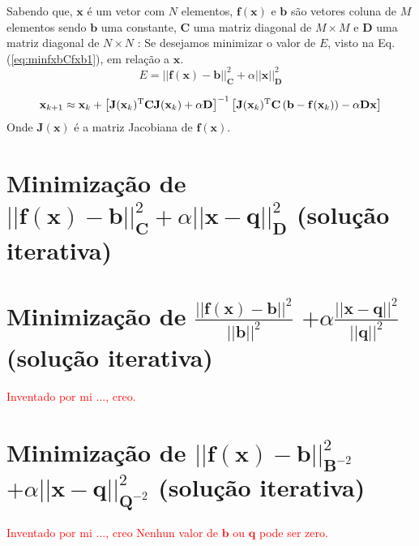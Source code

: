 \begin{theorem}\label{theo:minfxbCfxbaxax}
Sabendo que, $\mathbf{x}$ é um vetor com $N$ elementos, $\mathbf{f}(\mathbf{x})$ e 
$\mathbf{b}$ são vetores coluna de $M$ elementos sendo $\mathbf{b}$ uma constante,
$\mathbf{C}$ uma matriz diagonal de $M \times M$ e 
$\mathbf{D}$ uma matriz diagonal de $N \times N$ :
Se desejamos minimizar o valor de $E$, visto na Eq. (\ref{eq:minfxbCfxb1}), em relação a $\mathbf{x}$.
\begin{equation}\label{eq:minfxbCfxbaxax1}
E=||\mathbf{f}(\mathbf{x})-\mathbf{b}||_{\mathbf{C}}^2+\alpha||\mathbf{x}||_{\mathbf{D}}^2
\end{equation}

\begin{equation}
\mathbf{x}_{k+1}\approx \mathbf{x}_k+
\left[ \mathbf{J}(\mathbf{x}_k)^{\mathrm{T}}\mathbf{C} \mathbf{J}(\mathbf{x}_k) +\alpha\mathbf{D} \right]^{-1}
 \left[\mathbf{J}(\mathbf{x}_k)^{\mathrm{T}}\mathbf{C}\left(\mathbf{b}-\mathbf{f}(\mathbf{x}_k)\right)-\alpha\mathbf{D}\mathbf{x}\right]
\end{equation}
Onde  $\mathbf{J}(\mathbf{x})$ é a matriz Jacobiana de $\mathbf{f}(\mathbf{x})$.
\end{theorem} 



\section{Minimização de $||\mathbf{f}(\mathbf{x})-\mathbf{b}||_{\mathbf{C}}^2+\alpha||\mathbf{x}-\mathbf{q}||_{\mathbf{D}}^2$  
(solução iterativa)
}


\section{Minimização de $\frac{||\mathbf{f}(\mathbf{x})-\mathbf{b}||^2}{||\mathbf{b}||^2}$
$+\alpha\frac{||\mathbf{x}-\mathbf{q}||^2}{||\mathbf{q}||^2}$  
(solução iterativa)
}

\textcolor{red}{Inventado por mi ..., creo.}

\section{Minimização de $||\mathbf{f}(\mathbf{x})-\mathbf{b}||_{\mathbf{B}^{-2}}^2$
$+\alpha||\mathbf{x}-\mathbf{q}||_{\mathbf{Q}^{-2}}^2$  
(solução iterativa)
}


\textcolor{red}{Inventado por mi ..., creo Nenhun valor de $\mathbf{b}$ ou $\mathbf{q}$ pode ser zero.}


